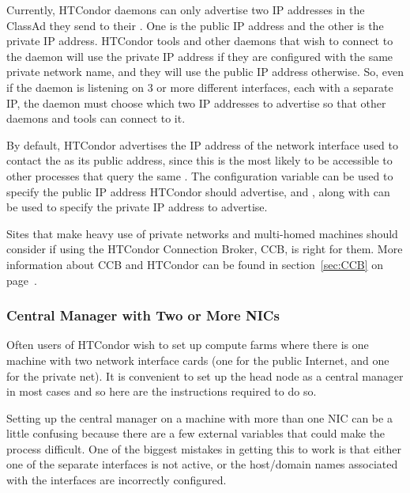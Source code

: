 \begin{description}
  Currently, HTCondor daemons can only advertise two IP addresses in
  the ClassAd they send to their .  One is the
  public IP address and the other is the private IP address.
  HTCondor tools and other daemons that wish to connect to the daemon will
  use the private IP address if they are configured with the same private
  network name, and they will use the public IP address otherwise.
  So, even if the daemon is listening on 3 or more different interfaces,
  each with a separate IP, the daemon must choose which two IP addresses to
  advertise so that other daemons and tools can connect to it.

  By default, HTCondor advertises the IP address of the network interface
  used to contact the  as its public address,
  since this is the most likely to be
  accessible to other processes that query the same .
  The  configuration variable can be used 
  to specify the public IP address HTCondor should advertise, and
  , along with
   can be used to specify the
  private IP address to advertise.

\end{description}

Sites that make heavy use of private networks and multi-homed machines
should consider if using the HTCondor Connection Broker, CCB,
is right for them.
More information about CCB and HTCondor can be found in
section~\ref{sec:CCB} on page~\pageref{sec:CCB}.


\subsubsection{Central Manager with Two or More NICs}

Often users of HTCondor wish to set up compute farms where there is one
machine with two network interface cards (one for the public Internet,
and one for the private net). It is convenient to set up the head
node as a central manager in most cases and so here are the instructions
required to do so.

Setting up the central manager on a machine with more than one NIC can
be a little confusing because there are a few external variables
that could make the process difficult. One of the biggest mistakes
in getting this to work is that either one of the separate interfaces is
not active, or the host/domain names associated with the interfaces are
incorrectly configured. 

